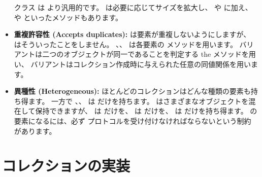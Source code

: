 \documentclass[a4paper,10pt,twoside]{book}
\begin{document}
\begin{itemize}
         クラス  は  より汎用的です。 は必要に応じてサイズを拡大し、 や  に加え、 や  といったメソッドもあります。
  
  \item {\bf 重複許容性 (Accepts duplicates):}
  	 は要素が重複しないようにしますが、 はそういったことをしません。
	、、 は各要素の \ct{=} メソッドを用います。 バリアントは二つのオブジェクトが同一であることを判定する the \ct{==} メソッドを用い、 バリアントはコレクション作成時に与えられた任意の同値関係を用います。

  \item {\bf 異種性 (Heterogeneous):}
        ほとんどのコレクションはどんな種類の要素も持ち得ます。
        一方で 、、 は  だけを持ちます。
         はさまざまなオブジェクトを混在して保持できますが、 は  だけを、 は  だけを、 は  だけを持ち得ます。
	 の要素になるには、必ず  プロトコルを受け付けなければならないという制約があります。
\end{itemize}


\section{コレクションの実装}
\end{document}
